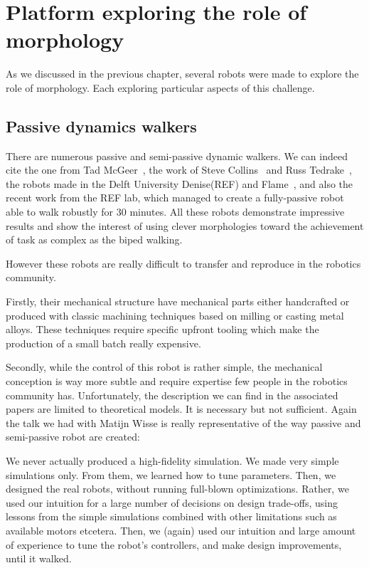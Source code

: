 \section{Platform exploring the role of morphology} %

As we discussed in the previous chapter, several robots were made to explore the role of morphology. Each exploring particular aspects of this challenge.


\subsection{Passive dynamics walkers} %

There are numerous passive and semi-passive dynamic walkers. We can indeed cite the one from Tad McGeer~\parencite{mcgeer1990passive}, the work of Steve Collins~\parencite{collins2001three} and Russ Tedrake~\parencite{tedrake2005learning}, the robots made in the Delft University Denise(REF) and Flame~\parencite{Hobbelen2008}, and also the recent work from the REF lab, which managed to create a fully-passive robot able to walk robustly for 30 minutes. All these robots demonstrate impressive results and show the interest of using clever morphologies toward the achievement of task as complex as the biped walking.

However these robots are really difficult to transfer and reproduce in the robotics community.

Firstly, their mechanical structure have mechanical parts either handcrafted or produced with classic machining techniques based on milling or casting metal alloys. These techniques require specific upfront tooling which make the production of a small batch really expensive.

Secondly, while the control of this robot is rather simple, the mechanical conception is way more subtle and require expertise few people in the robotics community has. Unfortunately, the description we can find in the associated papers are limited to theoretical models. It is necessary but not sufficient. Again the talk we had with Matijn Wisse is really representative of the way passive and semi-passive robot are created:

\begin{formal}
We never actually produced a high-fidelity simulation. We made very simple simulations only. From them, we learned how to tune parameters. Then, we designed the real robots, without running full-blown optimizations. Rather, we used our intuition for a large number of decisions on design trade-offs, using lessons from the simple simulations combined with other limitations such as available motors etcetera. Then, we (again) used our intuition and large amount of experience to tune the robot’s controllers, and make design improvements, until it walked.

\end{formal}

